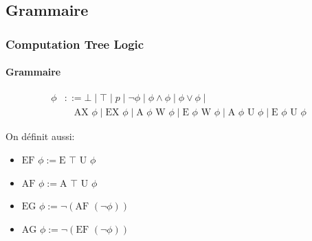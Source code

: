 \documentclass[11pt]{beamer}
\begin{document}
\subsection{Grammaire}
\begin{frame}
	\frametitle{Computation Tree Logic}
    \framesubtitle{Grammaire}

    \begin{align*}
    \phi &::= \bot \mid \top \mid p \mid \neg \phi \mid \phi\land\phi \mid \phi\lor\phi \mid \\
    &\quad \mbox{AX }\phi \mid \mbox{EX }\phi \mid
    \mbox{A }\phi \mbox{ W } \phi \mid \mbox{E }\phi \mbox{ W } \phi \mid
    \mbox{A }\phi \mbox{ U } \phi \mid \mbox{E }\phi \mbox{ U } \phi
    \end{align*}

    \pause
    \small
    On définit aussi:
    \begin{itemize}
        \item $\mbox{EF } \phi := \mbox{E } \top \mbox{ U } \phi$
        \item $\mbox{AF } \phi := \mbox{A } \top \mbox{ U } \phi$
        \item $\mbox{EG } \phi := \neg (\mbox{AF } (\neg \phi))$
        \item $\mbox{AG } \phi := \neg (\mbox{EF } (\neg \phi))$
    \end{itemize}
\end{frame}
\end{document}
